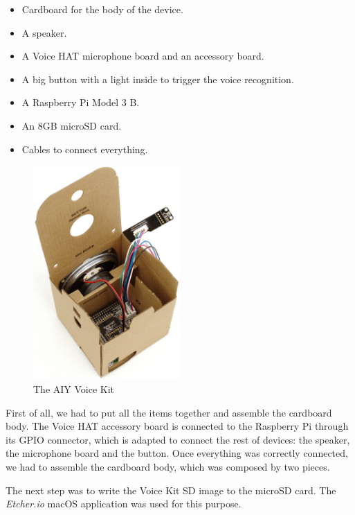 \begin{itemize}
    \item Cardboard for the body of the device.
    \item A speaker.
    \item A Voice HAT microphone board and an accessory board.
    \item A big button with a light inside to trigger the voice recognition.
    \item A Raspberry Pi Model 3 B.
    \item An 8GB microSD card.
    \item Cables to connect everything.
\end{itemize}

\begin{figure}
    \centering
    \includegraphics[width=0.5\textwidth]{images/Chapter_06/aiy-voice-kit.jpeg}
    \caption{The AIY Voice Kit}
    \label{fig:aiy-voice-kit}
\end{figure}

First of all, we had to put all the items together and assemble the cardboard body. The Voice HAT accessory board is connected to the
Raspberry Pi through its GPIO connector, which is adapted to connect the rest of devices: the speaker, the microphone board and the
button. Once everything was correctly connected, we had to assemble the cardboard body, which was composed by two
pieces.\cite{aiyProjectsVoice}

The next step was to write the Voice Kit SD image\cite{voiceKitSdImage} to the microSD card. The \textit{Etcher.io} macOS application
was used for this purpose.

